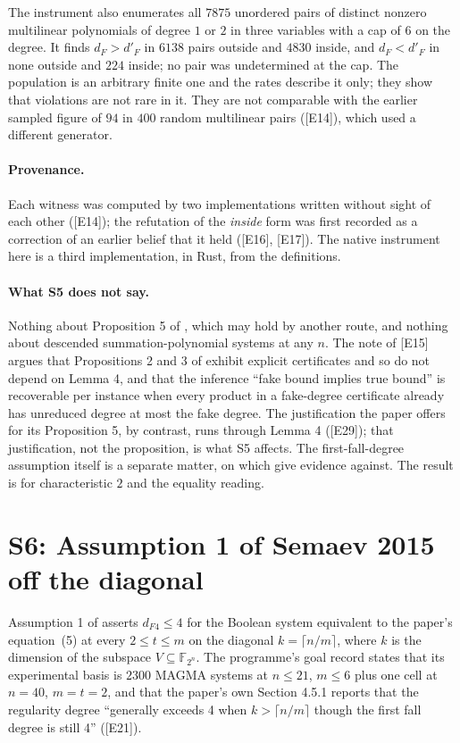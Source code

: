 \documentclass[10pt,a4paper]{article}
\newcommand{\FF}{\mathbb{F}}
\newcommand{\ev}[1]{\textup{[#1]}}
\theoremstyle{definition}
\theoremstyle{remark}
\begin{document}
The instrument also enumerates all $7875$ unordered pairs of distinct nonzero
multilinear polynomials of degree $1$ or $2$ in three variables with a cap of $6$ on
the degree. It finds $d_F>d'_F$ in $6138$ pairs outside and $4830$ inside, and
$d_F<d'_F$ in none outside and $224$ inside; no pair was undetermined at the cap.
The population is an arbitrary finite one and the rates describe it only; they show
that violations are not rare in it. They are not comparable with the earlier
sampled figure of $94$ in $400$ random multilinear pairs (\ev{E14}), which used a
different generator.

\paragraph{Provenance.}
Each witness was computed by two implementations written without sight of each
other (\ev{E14}); the refutation of the \emph{inside} form was first recorded as a
correction of an earlier belief that it held (\ev{E16}, \ev{E17}). The native instrument here is a
third implementation, in Rust, from the definitions.

\paragraph{What S5 does not say.}
Nothing about Proposition 5 of \cite{Nag15}, which may hold by another route, and
nothing about descended summation-polynomial systems at any $n$. The note of \ev{E15} argues that Propositions 2 and 3 of \cite{Nag15} exhibit explicit
certificates and so do not depend on Lemma 4, and that the inference ``fake bound implies
true bound'' is recoverable per instance when every product in a fake-degree certificate
already has unreduced degree at most the fake degree. The justification the paper offers
for its Proposition 5, by contrast, runs through Lemma 4 (\ev{E29}); that justification,
not the proposition, is what S5 affects. The first-fall-degree assumption itself
is a separate matter, on which \cite{HKY15} give evidence against. The result is for
characteristic $2$ and the equality reading.

\section{S6: Assumption 1 of Semaev 2015 off the diagonal}
\label{sec:s6}

Assumption 1 of \cite{Sem15} asserts $d_{F4}\le4$ for the Boolean system equivalent
to the paper's equation~(5) at every $2\le t\le m$ on the diagonal $k=\lceil n/m\rceil$,
where $k$ is the dimension of the subspace $V\subseteq\FF_{2^n}$. The programme's
goal record states that its experimental basis is $2300$ MAGMA systems at $n\le21$,
$m\le6$ plus one cell at $n=40$, $m=t=2$, and that the paper's own Section 4.5.1
reports that the regularity degree ``generally exceeds 4 when $k>\lceil n/m\rceil$
though the first fall degree is still 4'' (\ev{E21}).
\end{document}
